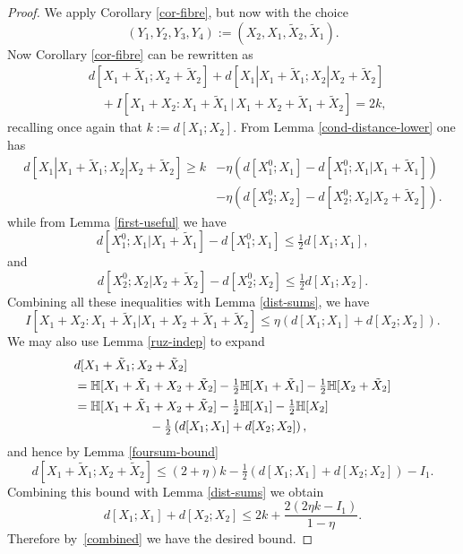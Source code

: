 \begin{proof}
  We apply Corollary \ref{cor-fibre}, but now with the choice
  \[
    (Y_1,Y_2,Y_3,Y_4) := (X_2, X_1, \tilde X_2, \tilde X_1).
  \]
  Now Corollary \ref{cor-fibre} can be rewritten as
  \begin{align*}
    &d[X_1+\tilde X_1;X_2+\tilde X_2] + d[X_1|X_1+\tilde X_1; X_2|X_2+\tilde X_2] \\
    &\quad + I[ X_1+X_2 : X_1 + \tilde X_1 \,|\, X_1+X_2+\tilde X_1+\tilde X_2 ] = 2k,
  \end{align*}
  recalling once again that $k := d[X_1;X_2]$.  From Lemma \ref{cond-distance-lower} one has
  \begin{align*}
    d[X_1|X_1+\tilde X_1; X_2|X_2+\tilde X_2]   \geq k &- \eta (d[X^0_1;X_1] - d[X^0_1;X_1|X_1+\tilde X_1]) \\& - \eta (d[X^0_2;X_2] - d[X^0_2;X_2|X_2+\tilde X_2]) .
  \end{align*}
  while from Lemma \ref{first-useful} we have
  \[
    d[X^0_1;X_1|X_1+\tilde X_1] -  d[X^0_1;X_1] \leq  \tfrac{1}{2} d[X_1;X_1],
  \]
  and
  \[
    d[X^0_2;X_2|X_2+\tilde X_2] -  d[X^0_2;X_2] \leq \tfrac{1}{2} d[X_1;X_2].
    \]
  Combining all these inequalities with Lemma \ref{dist-sums}, we have
  \begin{equation}\label{combined}
  I[ X_1+X_2 : X_1 + \tilde X_1 | X_1+X_2+\tilde X_1+\tilde X_2 ] \leq \eta ( d[X_1; X_1] + d[X_2; X_2] ).
  \end{equation}
  We may also use Lemma \ref{ruz-indep} to expand
  \begin{align*}
   & d[X_1+\tilde X_1;X_2+\tilde X_2] \\ &= \mathbb{H}[ X_1+\tilde X_1 + X_2 + \tilde X_2 ]  - \tfrac{1}{2} \mathbb{H}[X_1+\tilde X_1] - \tfrac{1}{2} \mathbb{H}[X_2+\tilde X_2] \\
    &= \mathbb{H}[ X_1+\tilde X_1 + X_2 + \tilde X_2]  - \tfrac{1}{2} \mathbb{H}[X_1] - \tfrac{1}{2} \mathbb{H}[X_2]  \\ & \qquad\qquad\qquad   - \tfrac{1}{2} \left( d[X_1;X_1] + d[X_2; X_2] \right),
  \end{align*}
  and hence by Lemma \ref{foursum-bound}
  \[
    d[X_1+\tilde X_1; X_2+\tilde X_2] \leq (2+\eta) k - \tfrac{1}{2} \left( d[X_1;X_1] + d[X_2;X_2] \right) - I_1.
  \]
  Combining this bound with Lemma \ref{dist-sums} we obtain
  \[ d[X_1;X_1] + d[X_2;X_2] \leq 2 k + \frac{2(2 \eta k - I_1)}{1-\eta}. \]
  Therefore by~\eqref{combined} we have the desired bound.
\end{proof}


